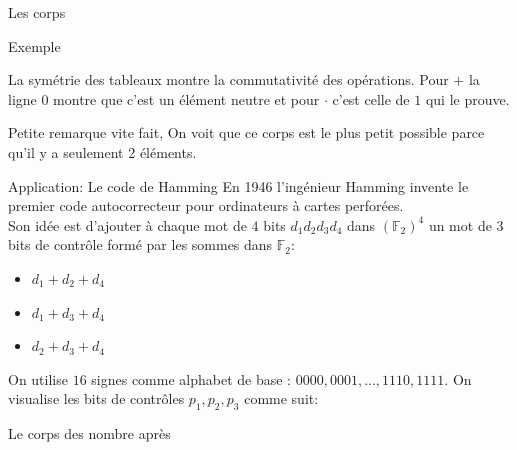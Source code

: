 \begin{parag}{Les corps}
\begin{subparag}{Exemple}
\begin{center}
        \end{center}


        \begin{framedremark}
            La symétrie des tableaux montre la commutativité des opérations. Pour $+$ la ligne $0$ montre que c'est un élément neutre et pour $\cdot$ c'est celle de $1$ qui le prouve.
        \end{framedremark}
        \begin{framedremark}
            Petite remarque vite fait, On voit que ce corps est le plus petit possible parce qu'il y a seulement 2 éléments.
        \end{framedremark}
    \end{subparag}

\end{parag}

\begin{parag}{Application: Le code de Hamming}
    En 1946 l'ingénieur Hamming invente le premier code autocorrecteur pour ordinateurs à cartes perforées.
    \\
    Son idée est d'ajouter à chaque mot de $4$ bits $d_1d_2d_3d_4$ dans $(\mathbb{F}_2)^4$ un mot de 
    3 bits de contrôle formé par les sommes dans $\mathbb{F}_2$:
    \begin{itemize}
        \item $d_1 + d_2 + d_4$
        \item $d_1 + d_3 + d_4$
        \item $d_2 +d_3 + d_4$
    \end{itemize}
    On utilise $16$ signes comme alphabet de base : $0000, 0001, \dots, 1110, 1111$. On visualise les bits de contrôles $p_1, p_2, p_3$ comme suit:
\end{parag}

\begin{parag}{Le corps des nombre}
    après
\end{parag}

